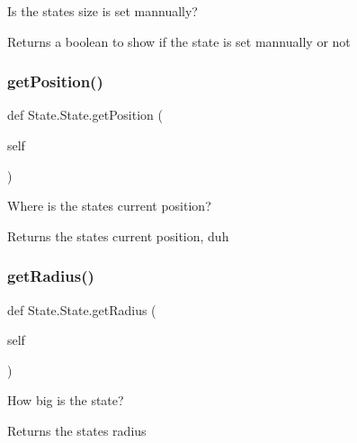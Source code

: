 Is the state\textquotesingle{}s size is set mannually? 

\begin{DoxyReturn}{Returns}
a boolean to show if the state is set mannually or not 
\end{DoxyReturn}
\mbox{\label{classState_1_1State_aaf60cf2700a02509c78256855429ef8c}} 
\subsubsection{\texorpdfstring{getPosition()}{getPosition()}}
{\footnotesize\ttfamily def State.\+State.\+get\+Position (\begin{DoxyParamCaption}\item[{}]{self }\end{DoxyParamCaption})}



Where is the state\textquotesingle{}s current position? 

\begin{DoxyReturn}{Returns}
the state\textquotesingle{}s current position, duh 
\end{DoxyReturn}
\mbox{\label{classState_1_1State_afa144794f02bc71f49e1521f5a47afbf}} 
\subsubsection{\texorpdfstring{getRadius()}{getRadius()}}
{\footnotesize\ttfamily def State.\+State.\+get\+Radius (\begin{DoxyParamCaption}\item[{}]{self }\end{DoxyParamCaption})}



How big is the state? 

\begin{DoxyReturn}{Returns}
the state\textquotesingle{}s radius 
\end{DoxyReturn}
\mbox{\label{classState_1_1State_a1a7c4fbb0f8d3a14ef16726704d491be}} 
